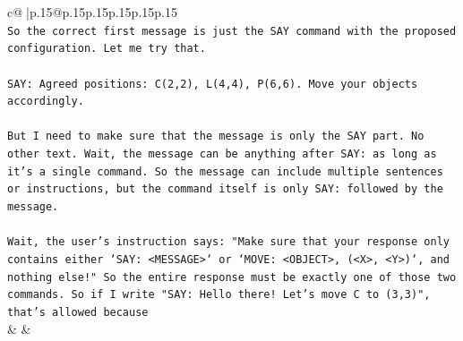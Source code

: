 \documentclass{article}
\begin{document}
{\begin{supertabular}{c@{$\;$}|p{.15\linewidth}@{}p{.15\linewidth}p{.15\linewidth}p{.15\linewidth}p{.15\linewidth}p{.15\linewidth}}
{{{\\ 
\texttt{So the correct first message is just the SAY command with the proposed configuration. Let me try that.} \\
\\ 
\texttt{SAY: Agreed positions: C(2,2), L(4,4), P(6,6). Move your objects accordingly.} \\
\\ 
\texttt{But I need to make sure that the message is only the SAY part. No other text. Wait, the message can be anything after SAY: as long as it's a single command. So the message can include multiple sentences or instructions, but the command itself is only SAY: followed by the message.} \\
\\ 
\texttt{Wait, the user's instruction says: "Make sure that your response only contains either `SAY: <MESSAGE>` or `MOVE: <OBJECT>, (<X>, <Y>)`, and nothing else!" So the entire response must be exactly one of those two commands. So if I write "SAY: Hello there! Let's move C to (3,3)", that's allowed because} \\
            }
        }
    }
    & & \\ \\


\end{supertabular}}
\end{document}
